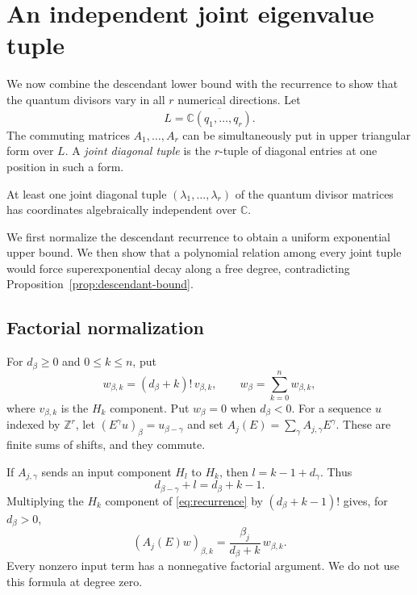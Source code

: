 \section{An independent joint eigenvalue tuple}\label{sec:spectral}

We now combine the descendant lower bound with the recurrence to show
that the quantum divisors vary in all $r$ numerical directions.
Let
\[
 L=\overline{\mathbb C(q_1,\ldots,q_r)}.
\]
The commuting matrices $A_1,\ldots,A_r$ can be simultaneously put in
upper triangular form over $L$. A \emph{joint diagonal tuple} is the
$r$-tuple of diagonal entries at one position in such a form.

\begin{proposition}\label{prop:spectral}
At least one joint diagonal tuple $(\lambda_1,\ldots,\lambda_r)$ of the
quantum divisor matrices has coordinates algebraically independent over
$\mathbb C$.
\end{proposition}

We first normalize the descendant recurrence to obtain a uniform
exponential upper bound. We then show that a polynomial relation among
every joint tuple would force superexponential decay along a free degree,
contradicting Proposition~\ref{prop:descendant-bound}.

\subsection{Factorial normalization}

For $d_\beta\ge0$ and $0\le k\le n$, put
\[
 w_{\beta,k}=(d_\beta+k)!\,v_{\beta,k},
 \qquad w_\beta=\sum_{k=0}^n w_{\beta,k},
\]
where $v_{\beta,k}$ is the $H_k$ component. Put $w_\beta=0$ when
$d_\beta<0$. For a sequence $u$ indexed by $\mathbb Z^r$, let
$(E^\gamma u)_\beta=u_{\beta-\gamma}$ and set
$A_j(E)=\sum_\gamma A_{j,\gamma}E^\gamma$.
These are finite sums of shifts, and they commute.

If $A_{j,\gamma}$ sends an input component $H_l$ to $H_k$, then
$l=k-1+d_\gamma$. Thus
\[
 d_{\beta-\gamma}+l=d_\beta+k-1.
\]
Multiplying the $H_k$ component of \eqref{eq:recurrence} by
$(d_\beta+k-1)!$ gives, for $d_\beta>0$,
\begin{equation}\label{eq:normalized-recurrence}
 (A_j(E)w)_{\beta,k}
       =\frac{\beta_j}{d_\beta+k}\,w_{\beta,k}.
\end{equation}
Every nonzero input term has a nonnegative factorial argument. We do not
use this formula at degree zero.

